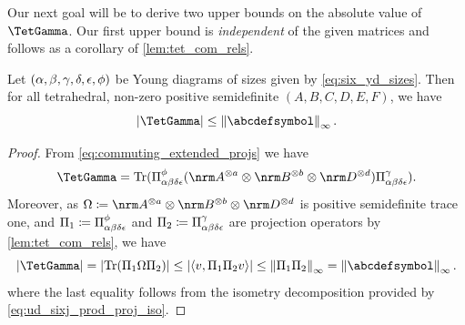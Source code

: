\documentclass[notitlepage, 10pt]{article}
\begin{document}
Our next goal will be to derive two upper bounds on the absolute value of $\TetGamma$.
Our first upper bound is \textit{independent} of the given matrices and follows as a corollary of \cref{lem:tet_com_rels}.
\begin{cor}
    \label{cor:abd_indep_upper_bound}
    Let $(\alpha,\beta,\gamma,\delta,\epsilon,\phi)$ be Young diagrams of sizes given by \cref{eq:six_yd_sizes}.
    Then for all tetrahedral, non-zero positive semidefinite $(A,B,C,D,E,F)$, we have
    \begin{equation}
        \label{eq:tet_gamma_sixj_upper_bound}
        \abs{\TetGamma}
        \leq \norm{\abcdefsymbol}_{\infty}.
    \end{equation}
\end{cor}
\begin{proof}
    From \cref{eq:commuting_extended_projs} we have
    \begin{equation}
        \TetGamma
        =
        \Tr(\Pi^{\yf}_{\ya\yb\yd\ye}(\nrm A^{\ot a} \ot \nrm B^{\ot b} \ot \nrm D^{\ot d}) \Pi^{\yc}_{\ya\yb\yd\ye}).
    \end{equation}
    Moreover, as $\Omega \coloneqq \nrm A^{\ot a} \ot \nrm B^{\ot b} \ot \nrm D^{\ot d}$ is positive semidefinite trace one,
    and $\Pi_1 \coloneqq \Pi^{\phi}_{\alpha\beta\delta\epsilon}$ and $\Pi_2 \coloneqq \Pi^{\gamma}_{\alpha\beta\delta\epsilon}$ are projection operators by \cref{lem:tet_com_rels}, we have
    \begin{equation}
        \abs{\TetGamma} = \abs{\Tr(\Pi_1 \Omega \Pi_2)} \leq \abs{\braket{v, \Pi_1 \Pi_2 v}} \leq \norm{\Pi_1\Pi_2}_{\infty} = \norm{\abcdefsymbol}_{\infty}.
    \end{equation}
    where the last equality follows from the isometry decomposition provided by \cref{eq:ud_sixj_prod_proj_iso}.
\end{proof}
\end{document}
